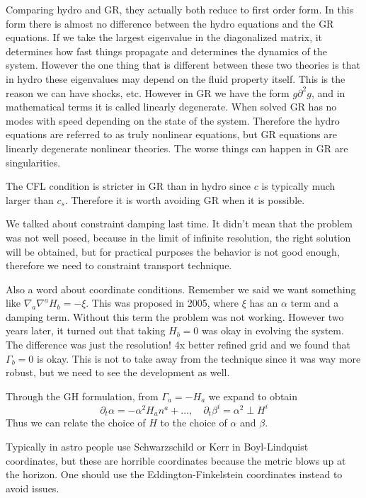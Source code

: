 \documentclass[letterpaper, 11pt]{article}
\numberwithin{equation}{section}
\numberwithin{figure}{section}
\begin{document}
Comparing hydro and GR, they actually both reduce to first order form. In this
form there is almost no difference between the hydro equations and the GR
equations. If we take the largest eigenvalue in the diagonalized matrix, it
determines how fast things propagate and determines the dynamics of the system.
However the one thing that is different between these two theories is that in
hydro these eigenvalues may depend on the fluid property itself. This is the
reason we can have shocks, etc. However in GR we have the form $g\partial^2g$,
and in mathematical terms it is called linearly degenerate. When solved GR has
no modes with speed depending on the state of the system. Therefore the hydro
equations are referred to as truly nonlinear equations, but GR equations are
linearly degenerate nonlinear theories. The worse things can happen in GR are
singularities.

The CFL condition is stricter in GR than in hydro since $c$ is typically much
larger than $c_{s}$. Therefore it is worth avoiding GR when it is possible.

We talked about constraint damping last time. It didn't mean that the problem
was not well posed, because in the limit of infinite resolution, the right
solution will be obtained, but for practical purposes the behavior is not good
enough, therefore we need to constraint transport technique.

Also a word about coordinate conditions. Remember we said we want something like
$\nabla_a\nabla^aH_{b} = -\xi$. This was proposed in 2005, where $\xi$ has an
$\alpha$ term and a damping term. Without this term the problem was not working.
However two years later, it turned out that taking $H_{b} = 0$ was okay in
evolving the system. The difference was just the resolution! 4x better refined
grid and we found that $\Gamma_{b} = 0$ is okay. This is not to take away from
the technique since it was way more robust, but we need to see the development
as well.

Through the GH formulation, from $\Gamma_{a} = -H_{a}$ we expand to obtain
\begin{equation}
  \label{eq:33}
  \partial_t\alpha = -\alpha^2H_an^a + \dots ,\quad \partial_t\beta^i = \alpha^2\perp H^i
\end{equation}
Thus we can relate the choice of $H$ to the choice of $\alpha$ and $\beta$.

Typically in astro people use Schwarzschild or Kerr in Boyl-Lindquist
coordinates, but these are horrible coordinates because the metric blows up at
the horizon. One should use the Eddington-Finkelstein coordinates instead to
avoid issues.
\end{document}
